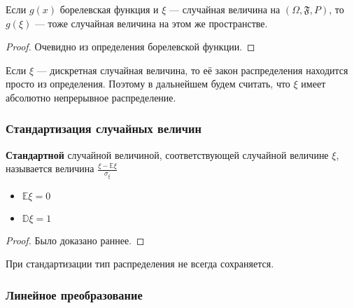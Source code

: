 \begin{theorem}
    Если \(g(x)\) борелевская функция и \(\xi\) --- случайная величина на \((\Omega, \mathfrak{F}, P)\), то \(g(\xi)\) --- тоже случайная величина на этом же пространстве.
\end{theorem}
\begin{proof}
    Очевидно из определения борелевской функции.
\end{proof}

\begin{remark}
    Если \(\xi\) --- дискретная случайная величина, то её закон распределения находится просто из определения. Поэтому в дальнейшем будем считать, что \(\xi\) имеет абсолютно непрерывное распределение.
\end{remark}

\subsubsection{Стандартизация случайных величин}

\begin{definition}
    \textbf{Стандартной} случайной величиной, соответствующей случайной величине \(\xi\), называется величина \(\frac{\xi - \mathbb{E}\xi}{\sigma_\xi} \)
\end{definition}
\begin{prop}\itemfix
    \begin{itemize}
        \item \(\mathbb{E}\xi = 0\)
        \item \(\mathbb{D}\xi = 1\)
    \end{itemize}
\end{prop}
\begin{proof}
    Было доказано раннее.
\end{proof}

\begin{remark}
    При стандартизации тип распределения не всегда сохраняется.
\end{remark}

\subsubsection{Линейное преобразование}

